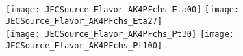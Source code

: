 \documentclass[landscape,10pt]{beamer} %
\begin{document}
\newpage

\begin{figure}[p]
\centering
\texttt{[image: JECSource\_Flavor\_AK4PFchs\_Eta00]}
\texttt{[image: JECSource\_Flavor\_AK4PFchs\_Eta27]}\\
\texttt{[image: JECSource\_Flavor\_AK4PFchs\_Pt30]}
\texttt{[image: JECSource\_Flavor\_AK4PFchs\_Pt100]}
\end{figure}
\end{document}
